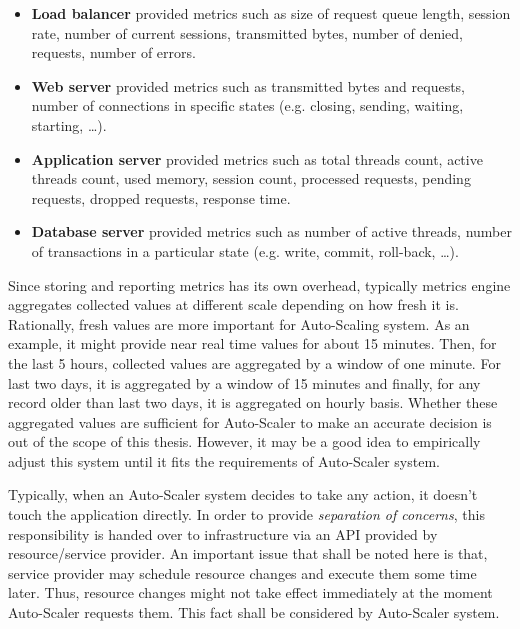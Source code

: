 \begin{description}[leftmargin=0pt]
\begin{itemize}
        \item \textbf{Load balancer} provided metrics such as size of request queue length, session rate, number of current sessions, transmitted bytes, number of denied, requests, number of errors.
        \item \textbf{Web server} provided metrics such as transmitted bytes and requests, number of connections in specific states (e.g. closing, sending, waiting, starting, \dots).
        \item \textbf{Application server} provided metrics such as total threads count, active threads count, used memory, session count, processed requests, pending requests, dropped requests, response time.
        \item \textbf{Database server} provided metrics such as number of active threads, number of transactions in a particular state (e.g. write, commit, roll-back, \dots).
    \end{itemize}
    Since storing and reporting metrics has its own overhead, typically metrics engine aggregates collected values at different scale depending on how fresh it is. Rationally, fresh values are more important for Auto-Scaling system. As an example, it might provide near real time values for about 15 minutes. Then, for the last 5 hours, collected values are aggregated by a window of one minute. For last two days, it is aggregated by a window of 15 minutes and finally, for any record older than last two days, it is aggregated on hourly basis. Whether these aggregated values are sufficient for Auto-Scaler to make an accurate decision is out of the scope of this thesis. However, it may be a good idea to empirically adjust this system until it fits the requirements of Auto-Scaler system.
    \item[Infrastructure API] Typically, when an Auto-Scaler system decides to take any action, it doesn't touch the application directly. In order to provide \emph{separation of concerns}, this responsibility is handed over to infrastructure via an API provided by resource/service provider. An important issue that shall be noted here is that, service provider may schedule resource changes and execute them some time later. Thus, resource changes might not take effect immediately at the moment Auto-Scaler requests them. This fact shall be considered by Auto-Scaler system.

\end{description}
